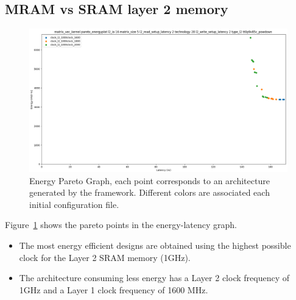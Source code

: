 \subsection{MRAM vs SRAM layer 2 memory}

\begin{figure}[tb] 
\centering
\includegraphics[width=\columnwidth]{images/sram_clocks_matrix_vec_5_energy_pareto.png}
\caption{\small Energy Pareto Graph, each point corresponds to an architecture generated by the framework. Different colors are associated each initial configuration file.}
\label{fig:srams_energy_graph}
\end{figure}

Figure~\ref{fig:srams_energy_graph} shows the pareto points in the energy-latency graph.
\begin{itemize}
	\item The most energy efficient designs are obtained using the highest possible clock for the Layer 2 SRAM memory (1GHz).
	\item The architecture consuming less energy has a Layer 2 clock frequency of 1GHz and a Layer 1 clock frequency of 1600 MHz.
\end{itemize}


